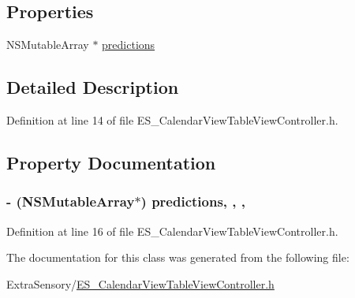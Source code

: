 \subsection*{Properties}
\begin{DoxyCompactItemize}
\item 
N\+S\+Mutable\+Array $\ast$ \hyperlink{interface_e_s___calendar_view_table_view_controller_a78a61ba4a07c146ba5c93f244fd76d4c}{predictions}
\end{DoxyCompactItemize}


\subsection{Detailed Description}


Definition at line 14 of file E\+S\+\_\+\+Calendar\+View\+Table\+View\+Controller.\+h.



\subsection{Property Documentation}
\hypertarget{interface_e_s___calendar_view_table_view_controller_a78a61ba4a07c146ba5c93f244fd76d4c}{
\subsubsection[{predictions}]{\setlength{\rightskip}{0pt plus 5cm}-\/ (N\+S\+Mutable\+Array$\ast$) predictions\hspace{0.3cm}{\ttfamily [read]}, {\ttfamily [write]}, {\ttfamily [nonatomic]}, {\ttfamily [strong]}}}\label{interface_e_s___calendar_view_table_view_controller_a78a61ba4a07c146ba5c93f244fd76d4c}


Definition at line 16 of file E\+S\+\_\+\+Calendar\+View\+Table\+View\+Controller.\+h.



The documentation for this class was generated from the following file\+:\begin{DoxyCompactItemize}
\item 
Extra\+Sensory/\hyperlink{_e_s___calendar_view_table_view_controller_8h}{E\+S\+\_\+\+Calendar\+View\+Table\+View\+Controller.\+h}\end{DoxyCompactItemize}
